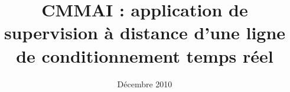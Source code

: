 \documentclass[a4paper]{report}
\title{CMMAI : application de supervision à distance d'une ligne de conditionnement temps réel}
\date{Décembre 2010}
\begin{document}
\maketitle

\vfill
\pagebreak

\tableofcontents

\vfill
\pagebreak
	
	
\end{document}
